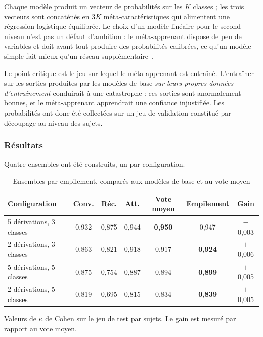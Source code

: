 Chaque modèle produit un vecteur de probabilités sur les $K$ classes ; les trois vecteurs
sont concaténés en $3K$ méta-caractéristiques qui alimentent une régression logistique
équilibrée. Le choix d'un modèle linéaire pour le second niveau n'est pas un défaut
d'ambition : le méta-apprenant dispose de peu de variables et doit avant tout produire
des probabilités calibrées, ce qu'un modèle simple fait mieux qu'un réseau
supplémentaire~\cite{ting1999}.

Le point critique est le jeu sur lequel le méta-apprenant est entraîné. L'entraîner sur
les sorties produites par les modèles de base \emph{sur leurs propres données
d'entraînement} conduirait à une catastrophe : ces sorties sont anormalement bonnes, et
le méta-apprenant apprendrait une confiance injustifiée. Les probabilités ont donc été
collectées sur un jeu de validation constitué par découpage au niveau des sujets.

\subsubsection{Résultats}

Quatre ensembles ont été construits, un par configuration.

\begin{table}[H]
\centering

\small
\begin{tabular}{@{}lcccccc@{}}
\toprule
\textbf{Configuration} & \textbf{Conv.} & \textbf{Réc.} & \textbf{Att.} &
\textbf{Vote moyen} & \textbf{Empilement} & \textbf{Gain} \\
\midrule
5 dérivations, 3 classes & 0,932 & 0,875 & 0,944 & \textbf{0,950} & 0,947 &
\textcolor{hypnored}{$-$0,003} \\
2 dérivations, 3 classes & 0,863 & 0,821 & 0,918 & 0,917 & \textbf{0,924} & $+$0,006 \\
5 dérivations, 5 classes & 0,875 & 0,754 & 0,887 & 0,894 & \textbf{0,899} & $+$0,005 \\
2 dérivations, 5 classes & 0,819 & 0,695 & 0,815 & 0,834 & \textbf{0,839} & $+$0,005 \\
\bottomrule
\end{tabular}
\vspace{2pt}
\raggedright\footnotesize
Valeurs de $\kappa$ de Cohen sur le jeu de test par sujets. Le gain est mesuré par
rapport au vote moyen.
\caption{Ensembles par empilement, comparés aux modèles de base et au vote moyen}
\label{tab:ensembles}
\end{table}

